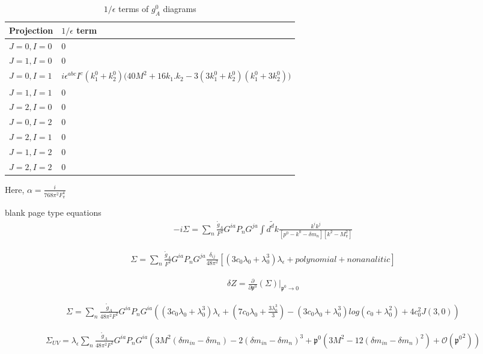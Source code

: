 \documentclass{article}
\newcommand{\bea}{\begin{eqnarray}}
\newcommand{\eea}{\end{eqnarray}}
\begin{document}
\bgroup
\def\arraystretch{2.5}%
\begin{table}
	[ht]
	\caption{$1/ \epsilon$ terms of $g_A^0$ diagrams}\label{table:gA4} 
	\begin{tabular}{ M{2.0cm} M{9.5cm}}
		\hline 
		Projection  & $1/ \epsilon$ term \\
		\hline 
		$J=0,I=0$ &  $ 0$  \\ 
		$J=1,I=0$ &  $ 0$  \\ 
		$J=0,I=1$ &  $ i \epsilon^{abc} I^c \left( k_1^0+k_2^0\right) \bigg( 40 M^2 +16 k_1.k_2 -3 (3k_1^0+k_2^0)(k_1^0+3k_2^0) \bigg) $  \\ 
		$J=1,I=1$ &  $  0 $\\
		$J=2,I=0$ &  $  0 $  \\ 
		$J=0,I=2$ &  $ 0 $  \\ 
		$J=2,I=1$ &  $  0 $  \\ 
		$J=1,I=2$ &  $  0 $  \\ 
		$J=2,I=2$ &  $  0 $  \\ 
		\hline
	\end{tabular}
\end{table}
\egroup

Here, $\alpha= \frac{ i}{768 \pi^2 F_\pi^4} $







\newpage
blank page
\newpage
type equations
\bea
-i\Sigma= \sum_{n}^{} \frac{\mathring{g}_A}{F^2} G^{ia} P_n G^{ja}  \int \tilde{d^dk} \frac{ k^i k^j  }{ \left[ p^0 -k^0 -\delta m_n \right] \left[k^2-M_\pi^2 \right] }
\eea

\bea
\Sigma= \sum_{n}^{} \frac{\mathring{g}_A}{F^2} G^{ia} P_n G^{ja} \frac{\delta_{ij}}{48\pi^2}  \left[(3c_0 \lambda_0 +\lambda_0^3)\lambda_\epsilon+ polynomial+nonanalitic \right]
\eea


\bea
\delta Z=  \frac{\partial}{ \partial \mathfrak{p^0}} \left( \Sigma \right) \bigg\rvert_{\mathfrak{p^0} \rightarrow 0  }
\eea

\bea
\Sigma= \sum_{n}^{} \frac{\mathring{g}_A}{48\pi^2F^2} G^{ia} P_n G^{ia} \left( (3c_0 \lambda_0 +\lambda_0^3)\lambda_\epsilon + \left( 7c_0\lambda_0 +\frac{3\lambda_0^3}{3}  \right) - (3c_0 \lambda_0 +\lambda_0^3) log(c_0+\lambda_0^2)+ 4c_0^2 J(3,0) \right)
\eea

\bea
\Sigma_{UV}= \lambda_\epsilon \sum_{n}^{} \frac{\mathring{g}_A}{48\pi^2F^2} G^{ia} P_n G^{ia} \left(   3M^2(\delta m_{in}-\delta m_n) -2(\delta m_{in}-\delta m_n)^3 + \mathfrak{p^0} \left(  3M^2-12(\delta m_{in}-\delta m_n)^2 \right) + \mathcal{O} \left( \mathfrak{p^0}^2 \right) \right)
\eea
\end{document}
